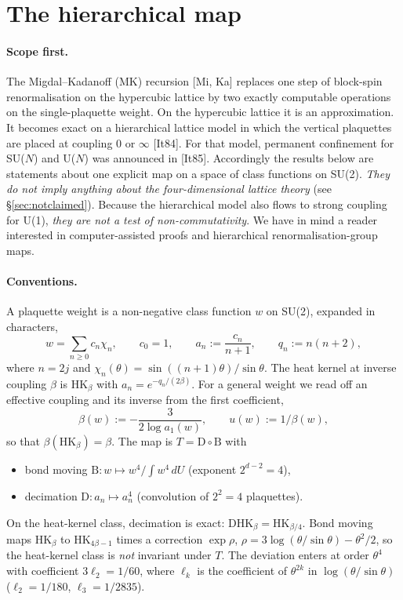 \documentclass[11pt,a4paper]{article}
\theoremstyle{definition}
\theoremstyle{remark}
\newcommand{\HK}{\mathrm{HK}}
\begin{document}
\section{The hierarchical map}\label{sec:map}

\paragraph{Scope first.}
The Migdal--Kadanoff (MK) recursion [Mi, Ka] replaces one step of block-spin renormalisation on the hypercubic lattice by two exactly computable operations on the single-plaquette weight.
On the hypercubic lattice it is an approximation.
It becomes exact on a hierarchical lattice model in which the vertical plaquettes are placed at coupling $0$ or $\infty$ [It84].
For that model, permanent confinement for SU($N$) and U($N$) was announced in [It85].
Accordingly the results below are statements about one explicit map on a space of class functions on SU(2).
\emph{They do not imply anything about the four-dimensional lattice theory} (see \S\ref{sec:notclaimed}).
Because the hierarchical model also flows to strong coupling for U(1), \emph{they are not a test of non-commutativity}.
We have in mind a reader interested in computer-assisted proofs and hierarchical renormalisation-group maps.

\paragraph{Conventions.}
A plaquette weight is a non-negative class function $w$ on SU(2), expanded in characters,
\[
w=\sum_{n\ge0}c_n\chi_n,\qquad c_0=1,\qquad a_n:=\frac{c_n}{n+1},\qquad q_n:=n(n+2),
\]
where $n=2j$ and $\chi_n(\theta)=\sin((n+1)\theta)/\sin\theta$.
The heat kernel at inverse coupling $\beta$ is $\HK_\beta$ with $a_n=e^{-q_n/(2\beta)}$.
For a general weight we read off an effective coupling and its inverse from the first coefficient,
\[
\beta(w):=-\frac{3}{2\log a_1(w)},\qquad u(w):=1/\beta(w),
\]
so that $\beta(\HK_\beta)=\beta$.
The map is $T=\mathrm{D}\circ\mathrm{B}$ with
\begin{itemize}[nosep]
\item bond moving $\mathrm{B}:w\mapsto w^4/\!\int w^4\,dU$ (exponent $2^{d-2}=4$),
\item decimation $\mathrm{D}:a_n\mapsto a_n^4$ (convolution of $2^2=4$ plaquettes).
\end{itemize}
On the heat-kernel class, decimation is exact: $\mathrm{D}\HK_{\beta}=\HK_{\beta/4}$.
Bond moving maps $\HK_\beta$ to $\HK_{4\beta-1}$ times a correction $\exp\rho$, $\rho=3\log(\theta/\sin\theta)-\theta^2/2$, so the heat-kernel class is \emph{not} invariant under $T$.
The deviation enters at order $\theta^4$ with coefficient $3\ell_2=1/60$, where $\ell_k$ is the coefficient of $\theta^{2k}$ in $\log(\theta/\sin\theta)$ ($\ell_2=1/180$, $\ell_3=1/2835$).
\end{document}
